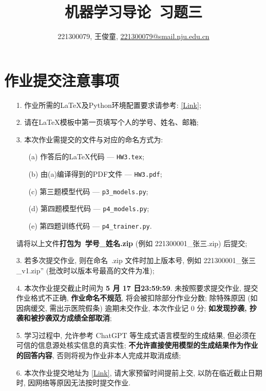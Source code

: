 \documentclass[a4paper,UTF8]{article}
\numberwithin{equation}{section}
\theoremstyle{definition}
\begin{document}
\title{机器学习导论\ 习题三}
\author{221300079, 王俊童, \href{mailto:221300079@smail.nju.edu.cn}{221300079@smail.nju.edu.cn}}
\maketitle
\section*{作业提交注意事项}
\begin{tcolorbox}
	\begin{enumerate}
    \item[1.] 作业所需的LaTeX及Python环境配置要求请参考: \href{https://www.lamda.nju.edu.cn/ML2024Spring/supplemantary/environment.pdf}{[Link]};
		\item[2.] 请在LaTeX模板中第一页填写个人的学号、姓名、邮箱;
		\item[3.] 本次作业需提交的文件与对应的命名方式为:
            \begin{enumerate}
                \item [(a)] 作答后的LaTeX代码 --- \texttt{HW3.tex};
                \item [(b)] 由(a)编译得到的PDF文件 --- \texttt{HW3.pdf};
                \item [(c)] 第三题模型代码 --- \texttt{p3\_models.py};
                \item [(d)] 第四题模型代码 --- \texttt{p4\_models.py};
                \item [(e)] 第四题训练代码 --- \texttt{p4\_trainer.py}.
            \end{enumerate}
            请将以上文件{\color{red}\textbf{打包为~学号\hspace{0em}\_\hspace{0em}姓名.zip}} (例如 221300001\hspace{0em}\_\hspace{0em}张三.zip) 后提交;
		\item[3.] 若多次提交作业, 则在命名~.zip 文件时加上版本号, 例如 221300001\_\hspace{0em}张三\hspace{0em}\_v1.zip” (批改时以版本号最高的文件为准);
		\item[4.] 本次作业提交截止时间为 {\color{red}\textbf{ 5 月 17 日23:59:59}}. 未按照要求提交作业, 提交作业格式不正确, {\color{red}\textbf{作业命名不规范}}, 将会被扣除部分作业分数; 除特殊原因 (如因病缓交, 需出示医院假条) 逾期未交作业, 本次作业记 0 分; {\color{red}\textbf{如发现抄袭, 抄袭和被抄袭双方成绩全部取消}};
        \item[5.] 学习过程中, 允许参考 ChatGPT 等生成式语言模型的生成结果, 但必须在可信的信息源处核实信息的真实性; {\color{red}\textbf{不允许直接使用模型的生成结果作为作业的回答内容}}, 否则将视为作业非本人完成并取消成绩;
		\item[6.] 本次作业提交地址为 \href{https://box.nju.edu.cn/u/d/cf36400095e94f769e1d/}{[Link]}, 请大家预留时间提前上交, 以防在临近截止日期时, 因网络等原因无法按时提交作业.
	\end{enumerate}
\end{tcolorbox}
\newpage
\end{document}
